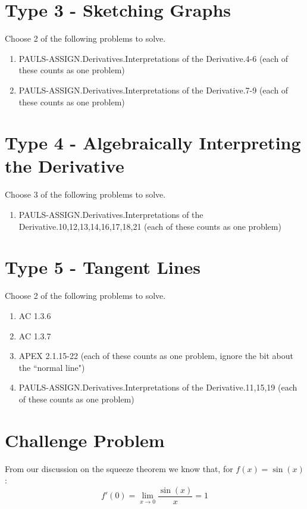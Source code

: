 \documentclass[12pt]{article}
\begin{document}
\section{Type 3 - Sketching Graphs}
Choose 2 of the following problems to solve.

\begin{enumerate}
  \item PAULS-ASSIGN.Derivatives.Interpretations of the Derivative.4-6 (each of these counts as one problem)
  \item PAULS-ASSIGN.Derivatives.Interpretations of the Derivative.7-9 (each of these counts as one problem) 
\end{enumerate}

\section{Type 4 - Algebraically Interpreting the Derivative}
Choose 3 of the following problems to solve.

\begin{enumerate}
  \item PAULS-ASSIGN.Derivatives.Interpretations of the Derivative.10,12,13,14,16,17,18,21 (each of these counts as one problem)
\end{enumerate}

\section{Type 5 - Tangent Lines}
Choose 2 of the following problems to solve.

\begin{enumerate}
  \item AC 1.3.6
  \item AC 1.3.7
  \item APEX 2.1.15-22 (each of these counts as one problem, ignore the bit about the ``normal line")
  \item PAULS-ASSIGN.Derivatives.Interpretations of the Derivative.11,15,19 (each of these counts as one problem)
\end{enumerate}

\section{Challenge Problem}

From our discussion on the squeeze theorem we know that, for $f(x) = \sin(x)$:
\begin{equation}
  f'(0) = \lim_{x \rightarrow 0} \dfrac{\sin(x)}{x} = 1
\end{equation}
\end{document}
